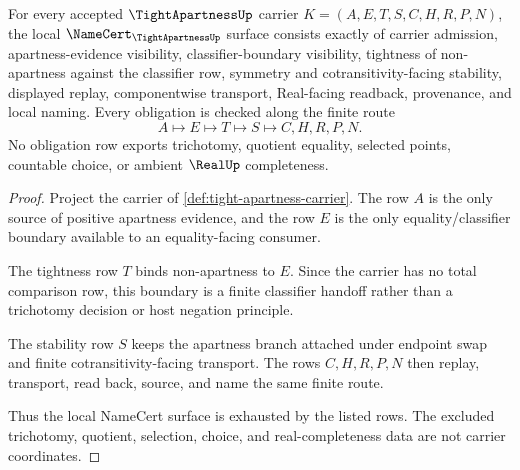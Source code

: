 \begin{theorem}
\label{thm:tight-apartness-namecert-obligations}
For every accepted $\TightApartnessUp$ carrier $K=(A,E,T,S,C,H,R,P,N)$, the local $\NameCert_{\TightApartnessUp}$ surface consists exactly of carrier admission, apartness-evidence visibility, classifier-boundary visibility, tightness of non-apartness against the classifier row, symmetry and cotransitivity-facing stability, displayed replay, componentwise transport, Real-facing readback, provenance, and local naming. Every obligation is checked along the finite route
$$
A\longmapsto E\longmapsto T\longmapsto S\longmapsto C,H,R,P,N .
$$
No obligation row exports trichotomy, quotient equality, selected points, countable choice, or ambient $\RealUp$ completeness.
\end{theorem}
\begin{proof}
Project the carrier of \autoref{def:tight-apartness-carrier}. The row $A$ is the only source of positive apartness evidence, and the row $E$ is the only equality/classifier boundary available to an equality-facing consumer.

The tightness row $T$ binds non-apartness to $E$. Since the carrier has no total comparison row, this boundary is a finite classifier handoff rather than a trichotomy decision or host negation principle.

The stability row $S$ keeps the apartness branch attached under endpoint swap and finite cotransitivity-facing transport. The rows $C,H,R,P,N$ then replay, transport, read back, source, and name the same finite route.

Thus the local NameCert surface is exhausted by the listed rows. The excluded trichotomy, quotient, selection, choice, and real-completeness data are not carrier coordinates.
\end{proof}


